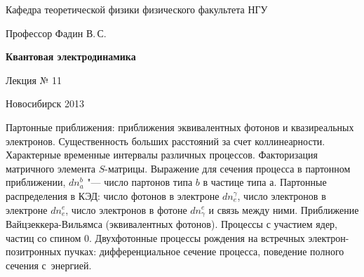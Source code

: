 \documentclass[12pt,pagesize,paper=landscape,paper=192mm:108mm]{scrbook}
\begin{document}
\begin{titlepage}
\begin{center}
    Кафедра теоретической физики физического факультета НГУ
    \medskip

    \Large
    Профессор Фадин В.\,С.
    \bigskip

    \huge
    \textbf{Квантовая электродинамика}
    \bigskip

    \Large
    Лекция № 11
    \vfill

    \normalsize
    \vfill

    \normalsize \ccbysa\hspace{0.5em}  Новосибирск 2013
  \end{center}
\end{titlepage}
\vspace*{-1em}
\begin{center}
\vfill
  \begin{minipage}{0.65\linewidth}
    Партонные приближения: приближения эквивалентных фотонов и
    квазиреальных электронов.  Существенность больших расстояний за
    счет коллинеарности. Характерные временные интервалы различных
    процессов. Факторизация матричного элемента $S$-матрицы. Выражение
    для сечения процесса в партонном приближении, $dn_a^b$ "--- число
    партонов типа $b$ в частице типа $а$. Партонные распределения в
    КЭД: число фотонов в электроне $dn_e^\gamma$, число электронов в
    электроне $dn_e^e$, число электронов в фотоне $dn_\gamma^e$ и
    связь между ними. Приближение Вайцзеккера-Вильямса (эквивалентных
    фотонов). Процессы с участием ядер, частиц со спином
    0. Двухфотонные процессы рождения на встречных
    электрон-позитронных пучках: дифференциальное сечение процесса,
    поведение полного сечения с~энергией.
  \end{minipage}
  \vfill

\end{center}
\end{document}
